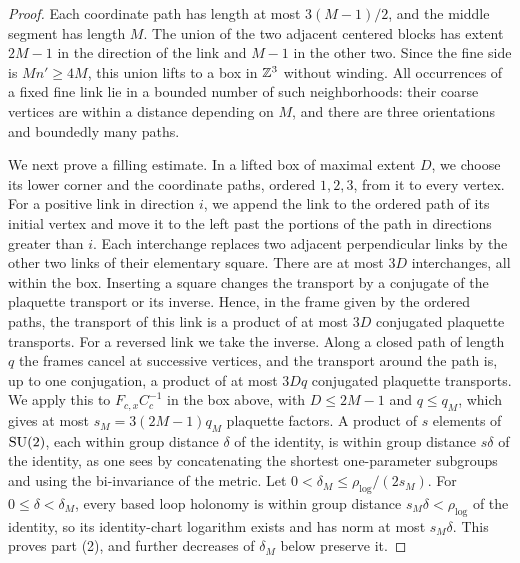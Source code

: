 \begin{proof}
Each coordinate path has length at most $3(M-1)/2$, and the middle segment has length $M$. The union of the two adjacent centered blocks has extent $2M-1$ in the direction of the link and $M-1$ in the other two. Since the fine side is $Mn'\ge4M$, this union lifts to a box in $\mathbb Z^3$ without winding. All occurrences of a fixed fine link lie in a bounded number of such neighborhoods: their coarse vertices are within a distance depending on $M$, and there are three orientations and boundedly many paths.

We next prove a filling estimate. In a lifted box of maximal extent $D$, we choose its lower corner and the coordinate paths, ordered $1,2,3$, from it to every vertex. For a positive link in direction $i$, we append the link to the ordered path of its initial vertex and move it to the left past the portions of the path in directions greater than $i$. Each interchange replaces two adjacent perpendicular links by the other two links of their elementary square. There are at most $3D$ interchanges, all within the box. Inserting a square changes the transport by a conjugate of the plaquette transport or its inverse. Hence, in the frame given by the ordered paths, the transport of this link is a product of at most $3D$ conjugated plaquette transports. For a reversed link we take the inverse. Along a closed path of length $q$ the frames cancel at successive vertices, and the transport around the path is, up to one conjugation, a product of at most $3Dq$ conjugated plaquette transports. We apply this to $F_{c,x}C_c^{-1}$ in the box above, with $D\le2M-1$ and $q\le q_M$, which gives at most $s_M=3(2M-1)q_M$ plaquette factors. A product of $s$ elements of $\mathrm{SU}(2)$, each within group distance $\delta$ of the identity, is within group distance $s\delta$ of the identity, as one sees by concatenating the shortest one-parameter subgroups and using the bi-invariance of the metric. Let $0<\delta_M\le\rho_{\log}/(2s_M)$. For $0\le\delta<\delta_M$, every based loop holonomy is within group distance $s_M\delta<\rho_{\log}$ of the identity, so its identity-chart logarithm exists and has norm at most $s_M\delta$. This proves part (2), and further decreases of $\delta_M$ below preserve it.


\end{proof}
